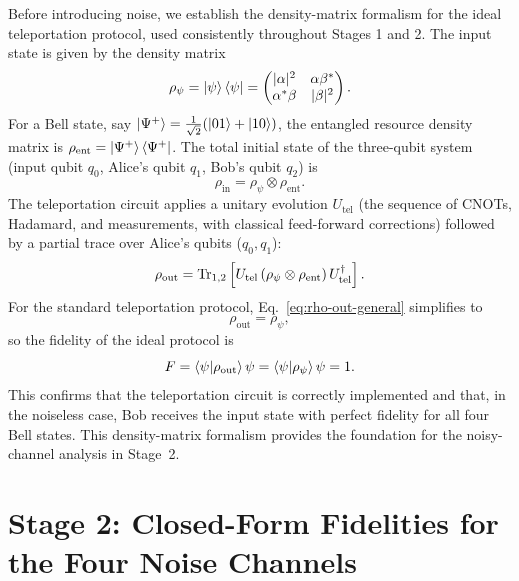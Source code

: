 \documentclass[11pt]{article}
\begin{document}
Before introducing noise, we establish the density-matrix formalism for the ideal teleportation protocol, used consistently throughout Stages 1 and 2. The input state is given by the density matrix
\begin{equation}
\rho_\psi = \ket{\psi}\bra{\psi} = \begin{pmatrix} |\alpha|^2 & \alpha\beta^* \\ \alpha^*\beta & |\beta|^2 \end{pmatrix}.
\label{eq:rho-psi}
\end{equation}
For a Bell state, say $\ket{\Psi^+}=\frac{1}{\sqrt2}(\ket{01}+\ket{10})$, the entangled resource density matrix is $\rho_{\text{ent}}=\ket{\Psi^+}\bra{\Psi^+}$. The total initial state of the three-qubit system (input qubit $q_0$, Alice's qubit $q_1$, Bob's qubit $q_2$) is
\begin{equation}
\rho_{\text{in}} = \rho_\psi \otimes \rho_{\text{ent}}.
\label{eq:rho-in}
\end{equation}
The teleportation circuit applies a unitary evolution $U_{\text{tel}}$ (the sequence of CNOTs, Hadamard, and measurements, with classical feed-forward corrections) followed by a partial trace over Alice's qubits ($q_0,q_1$):
\begin{equation}
\rho_{\text{out}} = \Tr_{1,2}\left[U_{\text{tel}}\left(\rho_\psi\otimes\rho_{\text{ent}}\right)U_{\text{tel}}^\dagger\right].
\label{eq:rho-out-general}
\end{equation}
For the standard teleportation protocol, Eq.~\eqref{eq:rho-out-general} simplifies to
\begin{equation}
\rho_{\text{out}} = \rho_\psi,
\label{eq:rho-out-ideal}
\end{equation}
so the fidelity of the ideal protocol is
\begin{equation}
F = \braket{\psi}{\rho_{\text{out}}}{\psi} = \braket{\psi}{\rho_\psi}{\psi} = 1.
\label{eq:F-ideal}
\end{equation}
This confirms that the teleportation circuit is correctly implemented and that, in the noiseless case, Bob receives the input state with perfect fidelity for all four Bell states. This density-matrix formalism provides the foundation for the noisy-channel analysis in Stage~2.

\section{Stage 2: Closed-Form Fidelities for the Four Noise Channels}
\label{sec:stage2-theory}
\end{document}
